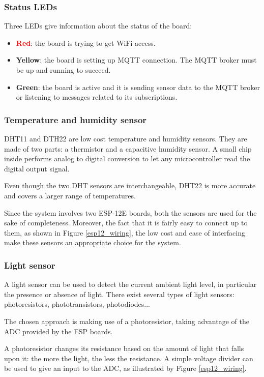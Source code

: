 \subsubsection{Status LEDs}
Three LEDs give information about the status of the board:

\begin{itemize}
	\item \textbf{\textcolor{red}{Red}}: the board is trying to get WiFi access.
	\item \textbf{\textcolor[rgb]{1,0.8,0}{Yellow}}: the board is setting up MQTT connection. The MQTT broker must be up and running to succeed.
	\item \textbf{\textcolor[rgb]{0,0.6,0}{Green}}: the board is active and it is sending sensor data to the MQTT broker or listening to messages related to its subscriptions.
\end{itemize}

\subsubsection{Temperature and humidity sensor}
DHT11 and DTH22 are low cost temperature and humidity sensors. They are made of two parts: a thermistor and a capacitive humidity sensor. A small chip inside performs analog to digital conversion to let any microcontroller read the digital output signal.

Even though the two DHT sensors are interchangeable, DHT22 is more accurate and covers a larger range of temperatures.

Since the system involves two ESP-12E boards, both the sensors are used for the sake of completeness. Moreover, the fact that it is fairly easy to connect up to them, as shown in Figure \ref{esp12_wiring}, the low cost and ease of interfacing make these sensors an appropriate choice for the system.

\subsubsection{Light sensor}
A light sensor can be used to detect the current ambient light level, in particular the presence or absence of light. There exist several types of light sensors: photoresistors, phototransistors, photodiodes...

The chosen approach is making use of a photoresistor, taking advantage of the ADC provided by the ESP boards.

A photoresistor changes its resistance based on the amount of light that falls upon it: the more the light, the less the resistance. A simple voltage divider can be used to give an input to the ADC, as illustrated by Figure \ref{esp12_wiring}.

